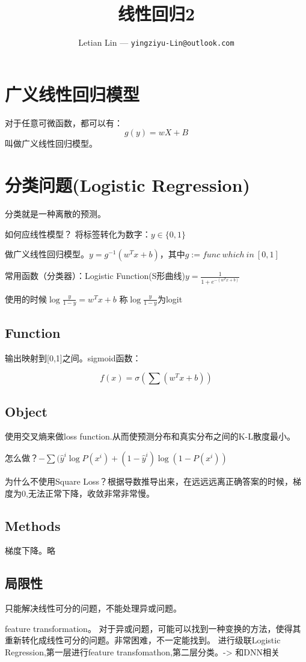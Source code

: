 \documentclass[UTF8]{ctexart}
\title{
	线性回归2
}
\author{
	Letian Lin --- \texttt{yingziyu-Lin@outlook.com}
}
\begin{document}
\maketitle
\section{广义线性回归模型}
对于任意可微函数，都可以有：$$g(y)=wX+B$$
叫做广义线性回归模型。

\section{分类问题(Logistic Regression)}
分类就是一种离散的预测。

如何应线性模型？
将标签转化为数字：$y\in \{0,1\}$

做广义线性回归模型。$y=g^{-1}(w^Tx+b)$，其中$g:=func\ which\ in\ [0,1]$

常用函数（分类器）：Logistic Function(S形曲线)$y=\frac{1}{1+e^{-(w^Tx+b)}}$

使用的时候$\log\frac{y}{1-y}=w^Tx+b$
称$\log\frac{y}{1-y}$为logit

\subsection{Function}
输出映射到[0,1]之间。sigmoid函数：

$$f(x)=\sigma(\sum(w^Tx+b))$$

\subsection{Object}
使用交叉熵来做loss function.从而使预测分布和真实分布之间的K-L散度最小。

怎么做？$-\sum(\hat y^i\log P(x^i) + (1-\hat y^i)\log(1- P(x^i))$

为什么不使用Square Loss？根据导数推导出来，在远远远离正确答案的时候，梯度为0,无法正常下降，收敛非常非常慢。

\subsection{Methods}

梯度下降。略

\subsection{局限性}
只能解决线性可分的问题，不能处理异或问题。

feature transformation。
对于异或问题，可能可以找到一种变换的方法，使得其重新转化成线性可分的问题。非常困难，不一定能找到。
进行级联Logistic Regression,第一层进行feature transfomathon,第二层分类。-> 和DNN相关
\end{document}
